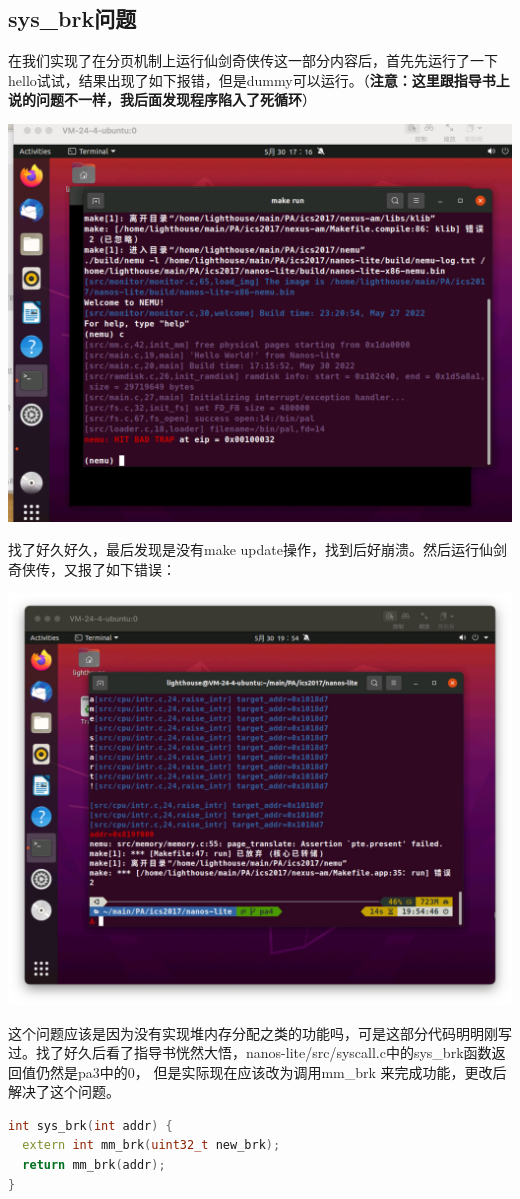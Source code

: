 \documentclass[UTF8,a4paper,10pt]{ctexart}
\begin{document}
\subsection{sys\_brk问题}
在我们实现了在分页机制上运行仙剑奇侠传这一部分内容后，首先先运行了一下hello试试，结果出现了如下报错，但是dummy可以运行。（\textbf{注意：这里跟指导书上说的问题不一样，我后面发现程序陷入了死循环}）
\begin{center}
  \includegraphics*[scale = 0.3]{./img/3771654599408_.pic_hd.jpg}
\end{center}
找了好久好久，最后发现是没有make update操作，找到后好崩溃。然后运行仙剑奇侠传，又报了如下错误：
\begin{center}
  \includegraphics*[scale  = 0.2]{img/报错3}
\end{center}
这个问题应该是因为没有实现堆内存分配之类的功能吗，可是这部分代码明明刚写过。找了好久后看了指导书恍然大悟，nanos-lite/src/syscall.c中的sys\_brk函数返回值仍然是pa3中的0， 但是实际现在应该改为调用mm\_brk 来完成功能，更改后解决了这个问题。
\begin{lstlisting}[language = C++]
int sys_brk(int addr) {
  extern int mm_brk(uint32_t new_brk);
  return mm_brk(addr);
}
\end{lstlisting}
\end{document}
